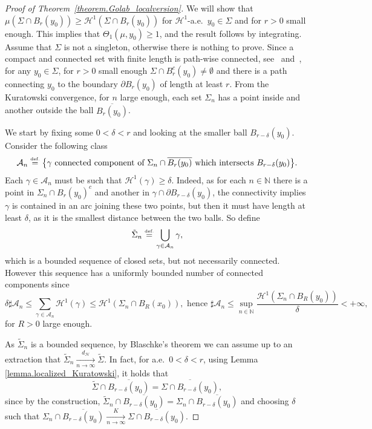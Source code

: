 \documentclass[JEP,XML,SOM,Unicode,NoFloatCountersInSection,published]{cedram}
\theoremstyle{definition}
\newcommand{\eqdef}{\ensuremath{\stackrel{\mbox{\upshape\tiny def.}}{=}}}
\newcommand\cH{\mathcal{H}}
\newcommand{\distH}{d_{\mathcal{H}}}
\begin{document}
\begin{proof}[Proof of Theorem~\ref{theorem.Golab_localversion}]
We will show that $\mu(\Sigma \cap B_r(y_0)) \ge \cH^1(\Sigma \cap B_r(y_0))$ for $\cH^1$\nobreakdash-a.e.\ $y_0\in \Sigma$ and for $r>0$ small enough. This implies that $\Theta_1(\mu, y_0) \ge 1$, and the result follows by integrating. Assume that $\Sigma$ is not a singleton, otherwise there is nothing to prove. Since a compact and connected set with finite length is path-wise connected, see~\cite[Prop.\,30.1 \& Cor.\,30.2]{david2006singular} and~\cite[Th.\,4.4]{alberti2017structure}, for any $y_0 \in \Sigma$, for $r>0$ small enough $\Sigma \cap B_r^c(y_0) \neq \emptyset$ and there is a path connecting $y_0$ to the boundary $\partial B_r(y_0)$ of length at least $r$. From the Kuratowski convergence, for $n$ large enough, each set $\Sigma_n$ has a point inside and another outside the ball $\overline{B_r(y_0)}$.

We start by fixing some $0< \delta < r$ and looking at the smaller ball $B_{r-\delta}(y_0)$. Consider the following class
\[
\mathcal{A}_n
\eqdef
\bigl\{
\gamma \text{ connected component of $\Sigma_n\cap \overline{B_r(y_0)}$ which intersects $B_{r-\delta}(y_0)$}
\bigr\}.
\]
Each $\gamma \in \mathcal{A}_n$ must be such that $\cH^1(\gamma) \ge \delta$. Indeed, as for each $n \in \mathbb{N}$ there is a point in $\Sigma_n\cap B_r(y_0)^c$ and another in $\gamma \cap \partial B_{r-\delta}(y_0)$, the connectivity implies $\gamma$ is contained in an arc joining these two points, but then it must have length at least $\delta$, as it is the smallest distance between the two balls. So define
\[
\tilde\Sigma_n \eqdef
\bigcup_{\gamma \in \mathcal{A}_n}
\gamma,
\]
which is a bounded sequence of closed sets, but not necessarily connected. However this sequence has a uniformly bounded number of connected components since
\[
\delta\sharp \mathcal{A}_n
\le
\sum_{\gamma \in \mathcal{A}_n} \cH^1(\gamma)
\le \cH^1(\Sigma_n \cap B_R(x_0)), \text{ hence }
\sharp \mathcal{A}_n
\le \sup_{n \in \mathbb{N}} \frac{\cH^1(\Sigma_n\cap B_R(y_0))}{\delta}
< +\infty,
\]
for $R>0$ large enough.

As $\tilde \Sigma_n$ is a bounded sequence, by Blaschke's theorem we can assume up to an extraction that $\tilde \Sigma_n \xrightarrow[n \to \infty]{\distH} \tilde \Sigma$. In fact, for a.e.\ $0 < \delta < r$, using Lemma \ref{lemma.localized_Kuratowski}, it holds that
\begin{equation}\label{identity}
\tilde \Sigma\cap \overline{B_{r-\delta}(y_0)} = \overline{\Sigma\cap B_{r-\delta}(y_0)},
\end{equation}
since by the construction, $\tilde \Sigma_n\cap \overline{B_{r-\delta}(y_0)} = \Sigma_n\cap \overline{B_{r-\delta}(y_0)}$ and choosing $\delta$ such that $\Sigma_n\cap \overline{B_{r-\delta}(y_0)} \xrightarrow[n \to \infty]{K} \overline{\Sigma\cap B_{r-\delta}(y_0)}$.


\end{proof}
\end{document}
